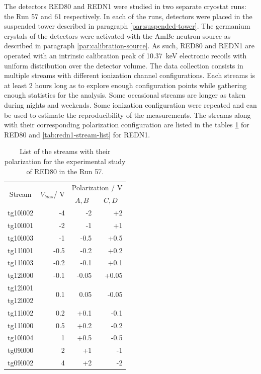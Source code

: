 The detectors RED80 and REDN1 were studied in two separate cryostat runs: the Run 57 and 61 respectively. In each of the runs, detectors were placed in the suspended tower described in paragraph \ref{par:suspended-tower}. The germanium crystals of the detectors were activated with the AmBe neutron source as described in paragraph \ref{par:calibration-source}. As such, RED80 and REDN1 are operated with an intrinsic calibration peak of \SI{10.37}{\kilo\eV} electronic recoils with uniform distribution over the detector volume. The data collection consists in multiple streams with different ionization channel configurations. Each streams is at least 2 hours long as to explore enough configuration points while gathering enough statistics for the analysis. Some occasional streams are longer as taken during nights and weekends. Some ionization configuration were repeated and can be used to estimate the reproducibility of the measurements. The streams along with their corresponding polarization configuration are listed in the tables \ref{tab:red80-stream-list} for RED80 and \ref{tab:redn1-stream-list} for REDN1.

\begin{table}[]
\centering
\begin{tabular}{c|rrr}
\multicolumn{1}{c|}{\multirow{2}{*}{Stream}} & \multicolumn{1}{c}{\multirow{2}{*}{$V_{bias}$/ V}} & \multicolumn{2}{|c}{Polarization / V}              \\ \cline{3-4} 
\multicolumn{1}{c|}{}                        & \multicolumn{1}{c|}{}                               & \multicolumn{1}{c|}{$A,B$} & \multicolumn{1}{c}{$C,D$} \\ \hline \hline
tg10l002 & -4   & -2    & +2    \\ \hline
tg10l001 & -2   & -1    & +1    \\ \hline
tg10l003 & -1   & -0.5  & +0.5  \\ \hline
tg11l001 & -0.5 & -0.2  & +0.2  \\ \hline
tg11l003 & -0.2 & -0.1  & +0.1  \\ \hline
tg12l000 & -0.1 & -0.05 & +0.05 \\ \hline
tg12l001                                     & \multirow{2}{*}{0.1}                                & \multirow{2}{*}{0.05}    & \multirow{2}{*}{-0.05}  \\
tg12l002 &      &       &       \\ \hline
tg11l002 & 0.2  & +0.1  & -0.1  \\ \hline
tg11l000 & 0.5  & +0.2  & -0.2  \\ \hline
tg10l004 & 1    & +0.5  & -0.5  \\ \hline
tg09l000 & 2    & +1    & -1    \\ \hline
tg09l002 & 4    & +2    & -2   
\end{tabular}%
\caption{List of the streams with their polarization for the experimental study of RED80 in the Run 57.}
\label{tab:red80-stream-list}
\end{table}

